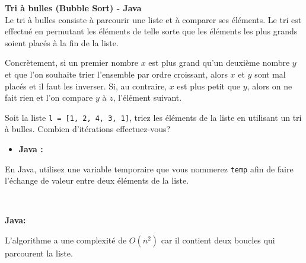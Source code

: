 \begin{Exercice} [20 minutes] \textbf{Tri à bulles (Bubble Sort) - Java} \optionnel \\
Le tri à bulles consiste à parcourir une liste et à comparer ses éléments. Le tri est effectué en permutant les éléments de telle sorte que les éléments les plus grands soient placés à la fin de la liste. 

Concrètement, si un premier nombre $x$ est plus grand qu'un deuxième nombre $y$ et que l'on souhaite trier l'ensemble par ordre croissant, alors $x$ et $y$ sont mal placés et il faut les inverser. Si, au contraire, $x$ est plus petit que $y$, alors on ne fait rien et l'on compare $y$ à $z$, l'élément suivant.

Soit la liste \lstinline{l = [1, 2, 4, 3, 1]}, triez les éléments de la liste en utilisant un tri à bulles. Combien d'itérations effectuez-vous?

\begin{itemize}
        \item \textbf{Java :}
             
    \end{itemize}
    
    \begin{conseil}
    En Java, utilisez une variable temporaire que vous nommerez \lstinline{temp} afin de faire l'échange de valeur entre deux éléments de la liste.
    \end{conseil}
    
    \ \\
    
    \begin{solution}
    \textbf{Java:}
     


    L'algorithme a une complexité de $O(n^2)$ car il contient deux boucles qui parcourent la liste.\\\\\\
            
\end{solution}
\end{Exercice}

